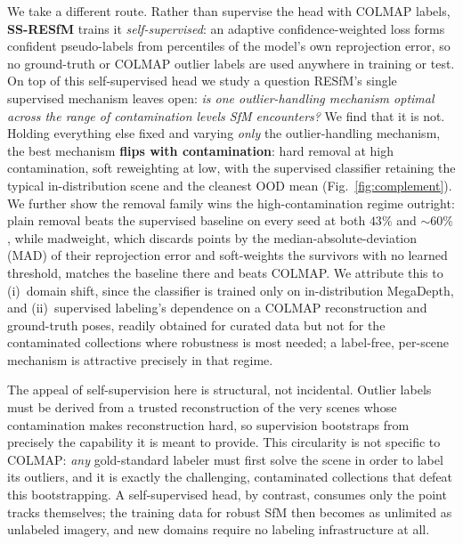 \documentclass{article}
\newcommand{\mad}{madweight}
\begin{document}
We take a different route. Rather than supervise the head with COLMAP labels, \textbf{SS-RESfM}
trains it \emph{self-supervised}: an adaptive confidence-weighted loss forms confident
pseudo-labels from percentiles of the model's own reprojection error, so no ground-truth or
COLMAP outlier labels are used anywhere in training or test. On top of this self-supervised
head we study a question RESfM's single supervised mechanism leaves open: \emph{is one
outlier-handling mechanism optimal across the range of contamination levels SfM encounters?}
We find that it is not. Holding everything else fixed and varying \emph{only} the
outlier-handling mechanism, the best mechanism \textbf{flips with contamination}:
hard removal at high contamination, soft reweighting at low, with the supervised
classifier retaining the typical in-distribution scene and the cleanest OOD mean
(Fig.~\ref{fig:complement}).
We further show the removal family wins the high-contamination regime outright: plain
removal beats the supervised baseline on every seed at both $43\%$ and $\sim\!60\%$,
while \mad{}, which discards points by the median-absolute-deviation (MAD) of their
reprojection error and soft-weights the survivors with no learned threshold, matches the
baseline there and beats COLMAP. We attribute this to
(i)~domain shift, since the classifier is trained only on in-distribution MegaDepth, and
(ii)~supervised labeling's dependence on a COLMAP reconstruction and ground-truth poses,
readily obtained for curated data but not for the contaminated collections where
robustness is most needed; a label-free, per-scene mechanism is attractive precisely
in that regime.

The appeal of self-supervision here is structural, not incidental. Outlier labels must be
derived from a trusted reconstruction of the very scenes whose contamination makes
reconstruction hard, so supervision bootstraps from precisely the capability it is meant
to provide. This circularity is not specific to COLMAP: \emph{any} gold-standard labeler
must first solve the scene in order to label its outliers, and it is exactly the
challenging, contaminated collections that defeat this bootstrapping. A self-supervised
head, by contrast, consumes only the point tracks themselves; the training data for robust
SfM then becomes as unlimited as unlabeled imagery, and new domains require no labeling
infrastructure at all.
\end{document}
